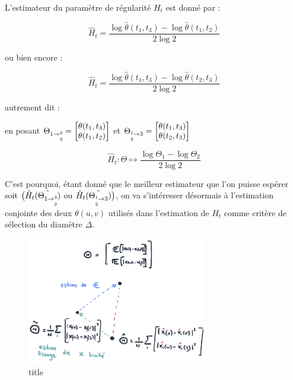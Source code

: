 

L'estimateur du paramètre de régularité $H_t$ est donné par :

$$\hat H_t = \frac{ \log \hat \theta(t_1, t_3) - \log \hat \theta(t_1, t_2) }{2 \log 2}$$

ou bien encore :

$$\hat H_t = \frac{ \log \hat \theta(t_1, t_3) - \log \hat \theta(t_2, t_3) }{2 \log 2}$$


autrement dit :

en posant $\Theta_{1 \rightarrow \overset{3}{\underset {2}{}}} = \begin{bmatrix} \theta(t_1, t_3) \\ \theta(t_1, t_2) \end{bmatrix}$ et $\Theta_{\overset 1{\underset{2}{ }} \rightarrow3} = \begin{bmatrix} \theta(t_1, t_3) \\ \theta(t_2, t_3) \end{bmatrix}$

$$
    \hat H_t : \Theta \longmapsto \frac{ \log \Theta_1 - \log \Theta_2 }{2 \log 2}
$$

C'est pourquoi, étant donné que le meilleur estimateur que l'on puisse espérer soit $\bigl(\hat H_t( \tilde {\Theta_{1 \rightarrow \overset{3}{\underset {2}{}}}})$ ou $\hat H_t( \tilde {\Theta_{\overset 1{\underset{2}{ }} \rightarrow3}})\bigr)$, on va s'intéresser désormais à l'estimation conjointe des deux $\theta(u,v)$ utilisés dans l'estimation de $H_t$ comme critère de sélection du diamètre $\Delta$.

\begin{figure}[H]
    \centering
    \includegraphics[width=0.7\textwidth]{Images/sketches/theta_biais.jpg}
    \caption{title}
    \label{fig:sketch_theta_biais}
\end{figure}


